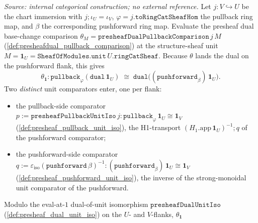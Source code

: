 \begin{lemma}\leanok
  \label{lem:presheafdualunitiso_pullback_natural}
  \textit{Source: internal categorical construction; no external reference.}
  Let \(j : V \hookrightarrow U\) be the chart immersion with \(j \mathbin{;} \iota_U = \iota_V\),
  \(\varphi = j.\mathtt{toRingCatSheafHom}\) the pullback ring map, and \(\beta\) the corresponding
  pushforward ring map. Evaluate the presheaf dual base-change comparison
  \(\theta_M = \mathtt{presheafDualPullbackComparison}\,j\,M\)
  (\cref{def:presheafdual_pullback_comparison}) at the structure-sheaf unit
  \(M = \mathbf 1_U = \mathtt{SheafOfModules.unit}\,U.\mathtt{ringCatSheaf}\). Because \(\theta\) lands
  the dual on the pushforward flank, this gives
  \[
    \theta_{\mathbf 1} : \mathtt{pullback}_\varphi(\mathtt{dual}\,\mathbf 1_U)
      \;\cong\; \mathtt{dual}\bigl((\mathtt{pushforward}_\beta)\,\mathbf 1_U\bigr).
  \]
  Two \emph{distinct} unit comparators enter, one per flank:
  \begin{itemize}
    \item the pullback-side comparator
      \(p := \mathtt{presheafPullbackUnitIso}\,j : \mathtt{pullback}_\varphi\,\mathbf 1_U \cong \mathbf 1_V\)
      (\cref{def:presheaf_pullback_unit_iso}), the H1-transport \((H_1.\mathrm{app}\,\mathbf 1_U)^{-1}
      \mathbin{;} q\) of the pushforward comparator;
    \item the pushforward-side comparator
      \(q := \varepsilon_{\mathrm{iso}}(\mathtt{pushforward}\,\beta)^{-1} :
        (\mathtt{pushforward}_\beta)\,\mathbf 1_U \cong \mathbf 1_V\)
      (\cref{def:presheaf_pushforward_unit_iso}), the inverse of the strong-monoidal unit comparator
      of the pushforward.
  \end{itemize}
  Modulo the eval-at-\(1\) dual-of-unit isomorphism \(\mathtt{presheafDualUnitIso}\)
  (\cref{def:presheaf_dual_unit_iso}) on the \(U\)- and \(V\)-flanks, \(\theta_{\mathbf 1}\)

\end{lemma}
